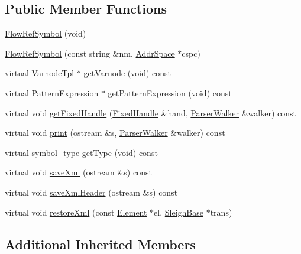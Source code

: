 \subsection*{Public Member Functions}
\begin{DoxyCompactItemize}
\item 
\mbox{\hyperlink{class_flow_ref_symbol_a6e08a033a20d06bfc3a22adaff69db96}{Flow\+Ref\+Symbol}} (void)
\item 
\mbox{\hyperlink{class_flow_ref_symbol_a5330aba4060d38db2fff04d475a039fd}{Flow\+Ref\+Symbol}} (const string \&nm, \mbox{\hyperlink{class_addr_space}{Addr\+Space}} $\ast$cspc)
\item 
virtual \mbox{\hyperlink{class_varnode_tpl}{Varnode\+Tpl}} $\ast$ \mbox{\hyperlink{class_flow_ref_symbol_af5c2756a1ef4ef4a7bc454a328275d73}{get\+Varnode}} (void) const
\item 
virtual \mbox{\hyperlink{class_pattern_expression}{Pattern\+Expression}} $\ast$ \mbox{\hyperlink{class_flow_ref_symbol_a273808a2774690c6c194961c956e3330}{get\+Pattern\+Expression}} (void) const
\item 
virtual void \mbox{\hyperlink{class_flow_ref_symbol_af26eaa696c4a83005f982aa4bfa5a740}{get\+Fixed\+Handle}} (\mbox{\hyperlink{struct_fixed_handle}{Fixed\+Handle}} \&hand, \mbox{\hyperlink{class_parser_walker}{Parser\+Walker}} \&walker) const
\item 
virtual void \mbox{\hyperlink{class_flow_ref_symbol_a8f6e9171c4a26b35f20e6026aafa94a2}{print}} (ostream \&s, \mbox{\hyperlink{class_parser_walker}{Parser\+Walker}} \&walker) const
\item 
virtual \mbox{\hyperlink{class_sleigh_symbol_aba70f7f332fd63488c5ec4bd7807db41}{symbol\+\_\+type}} \mbox{\hyperlink{class_flow_ref_symbol_a2cd681712810c2759731035c81aefd36}{get\+Type}} (void) const
\item 
virtual void \mbox{\hyperlink{class_flow_ref_symbol_a6e4019b02ff19539264b2a717828483c}{save\+Xml}} (ostream \&s) const
\item 
virtual void \mbox{\hyperlink{class_flow_ref_symbol_aa98cb037aedede53c7306aa43cb7310b}{save\+Xml\+Header}} (ostream \&s) const
\item 
virtual void \mbox{\hyperlink{class_flow_ref_symbol_a64565b89e176acc3743f31133548310d}{restore\+Xml}} (const \mbox{\hyperlink{class_element}{Element}} $\ast$el, \mbox{\hyperlink{class_sleigh_base}{Sleigh\+Base}} $\ast$trans)
\end{DoxyCompactItemize}
\subsection*{Additional Inherited Members}


